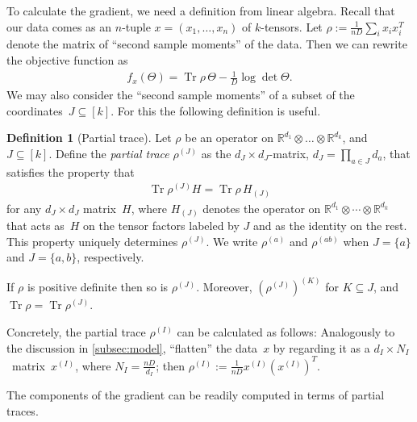\documentclass[aos]{imsart}
\theoremstyle{definition}
\newtheorem*{definition}{Definition}
\numberwithin{equation}{section}
\DeclareMathOperator{\tr}{Tr}
\newcommand{\R}{{\mathbb{R}}}
\newcommand{\ot}{\otimes}
\begin{document}
To calculate the gradient, we need a definition from linear algebra.
Recall that our data comes as an $n$-tuple $x=(x_1,\dots,x_n)$ of $k$-tensors. %
Let $\rho := \frac1{nD}\sum_i x_i x_i^T$ denote the matrix of ``second sample moments'' of the data.
Then we can rewrite the objective function as
\begin{align}\label{eq:obj via rho}
  f_x(\Theta) = \tr \rho \, \Theta - \frac1D \log \det \Theta.
\end{align}
We may also consider the ``second sample moments'' of a subset of the coordinates~$J \subseteq [k]$.
For this the following definition is useful.

\begin{definition}[Partial trace]
Let $\rho$ be an operator on $\R^{d_1} \ot \dots \ot \R^{d_k}$, and~$J \subseteq [k]$.
Define the \emph{partial trace} $\rho^{(J)}$ as the $d_J \times d_J$-matrix, $d_J = \prod_{a\in J} d_a$, that satisfies the property that
\begin{align}\label{eq:partial trace duality}
  \tr \rho^{(J)} H
= \tr \rho \, H_{(J)}
\end{align}
for any $d_J\times d_J$ matrix~$H$, where $H_{(J)}$ denotes the operator on $\R^{d_1} \ot \cdots \ot \R^{d_k}$ that acts as~$H$ on the tensor factors labeled by $J$ and as the identity on the rest.
This property uniquely determines $\rho^{(J)}$.
We write $\rho^{(a)}$ and $\rho^{(ab)}$ when $J=\{a\}$ and $J=\{a,b\}$, respectively.


If $\rho$ is positive definite then so is $\rho^{(J)}$.
Moreover, $(\rho^{(J)})^{(K)}$ for $K \subseteq J$, and $\tr \rho = \tr \rho^{(J)}$.
\end{definition}

Concretely, the partial trace $\rho^{(I)}$ can be calculated as follows:
Analogously to the discussion in \cref{subsec:model}, ``flatten'' the data~$x$ by regarding it as a $d_I \times N_I$~matrix~$x^{(I)}$, where $N_I = \frac{nD}{d_I}$;
then $\rho^{(I)} := \frac1{nD} x^{(I)} (x^{(I)})^T$.

The components of the gradient can be readily computed in terms of partial traces.
\end{document}
